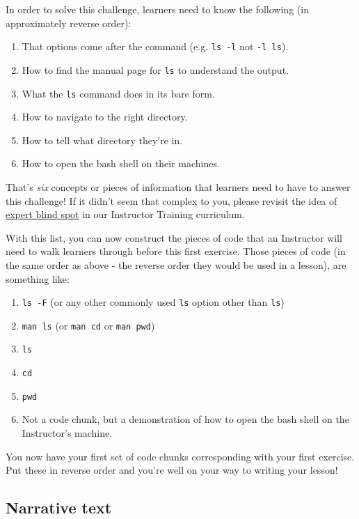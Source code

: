\documentclass[]{book}
\providecommand{\tightlist}{%
  \setlength{\itemsep}{0pt}\setlength{\parskip}{0pt}}
\begin{document}
In order to solve this challenge, learners need to know the following (in approximately reverse order):

\begin{enumerate}
\def\labelenumi{\arabic{enumi}.}
\tightlist
\item
  That options come after the command (e.g. \texttt{ls\ -l} not \texttt{-l\ ls}).
\item
  How to find the manual page for \texttt{ls} to understand the output.
\item
  What the \texttt{ls} command does in its bare form.
\item
  How to navigate to the right directory.
\item
  How to tell what directory they're in.
\item
  How to open the bash shell on their machines.
\end{enumerate}

That's \emph{six} concepts or pieces of information that learners need to have to answer this challenge! If it
didn't seem that complex to you, please revisit the idea of \href{https://carpentries.github.io/instructor-training/03-expertise/index.html}{expert blind spot} in our Instructor Training
curriculum.

With this list, you can now construct the pieces of code that an Instructor will need to walk learners through
before this first exercise. Those pieces of code (in the same order as above - the reverse order they would
be used in a lesson), are something like:

\begin{enumerate}
\def\labelenumi{\arabic{enumi}.}
\tightlist
\item
  \texttt{ls\ -F} (or any other commonly used \texttt{ls} option other than \texttt{ls})
\item
  \texttt{man\ ls} (or \texttt{man\ cd} or \texttt{man\ pwd})
\item
  \texttt{ls}
\item
  \texttt{cd}
\item
  \texttt{pwd}
\item
  Not a code chunk, but a demonstration of how to open the bash shell on the Instructor's machine.
\end{enumerate}

You now have your first set of code chunks corresponding with your first exercise. Put these in reverse order
and you're well on your way to writing your lesson!

\hypertarget{narrative-text}{%
\subsection{Narrative text}\label{narrative-text}}
\end{document}
